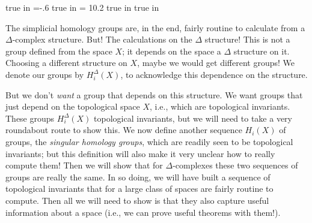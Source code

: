 
\overfullrule=0pt
\parindent=0pt

\nopagenumbers




 true in
\hoffset=-.6 true in
\hsize = 10.2 true in
 true in



\def\cltr{\Red}		  %

\loadmsbm



\def\ctln{\centerline}
\def\u{\underbar}
\def\ssk{\smallskip}
\def\msk{\medskip}
\def\bsk{\bigskip}
\def\hsk{\hskip.1in}
\def\hhsk{\hskip.2in}
\def\dsl{\displaystyle}
\def\hskp{\hskip1.5in}

\def\lra{$\Leftrightarrow$ }
\def\ra{\rightarrow}
\def\mpto{\logmapsto}
\def\pu{\pi_1}
\def\mpu{$\pi_1$}
\def\sig{\Sigma}
\def\msig{$\Sigma$}
\def\ep{\epsilon}
\def\sset{\subseteq}
\def\del{\partial}
\def\inv{^{-1}}
\def\wtl{\widetilde}
\def\del{\partial}
\def\delp{\partial^\prime}
\def\delpp{\partial^{\prime\prime}}
\def\sgn{{\roman{sgn}}}
\def\wtih{\widetilde{H}}
\def\bbz{{\Bbb Z}}
\def\bbr{{\Bbb R}}
\def\rtar{$\Rightarrow$}

\def\cltr{\Red}		  %
\def\cltb{\Blue}		  %
\def\cltg{\PineGreen}	  %




The simplicial homology groups are, in the end, fairly routine to calculate from a 
$\Delta$-complex structure. But! The calculations
\u{depend} on the $\Delta$ structure! This is not a group defined from the space
$X$; it depends on the space \u{and} a $\Delta$ structure on it. 
Choosing a different structure on $X$, maybe we would get
different groups! We \u{should} denote our groups by $H_i^\Delta(X)$, to 
acknowledge this dependence on the structure.

\bsk

But we don't {\it want} a group that depends on this structure. We want groups that
just depend on the topological space $X$, i.e., which are topological invariants.
These groups $H_i^\Delta(X)$ \u{are} topological invariants,
but we will need to take a very roundabout route to show this. We
now define another sequence $H_i(X)$ of groups, the {\it singular homology
groups}, which are readily seen to be topological invariants;
but this definition will also make it very unclear how to really compute them! 
Then we will show that for $\Delta$-complexes these two sequences of groups
are really the same. In so doing, we will have built a sequence of topological
invariants that for a large class of spaces are fairly routine to compute. Then
all we will need to show is that they also capture useful information about
a space (i.e., we can prove useful theorems with them!).

